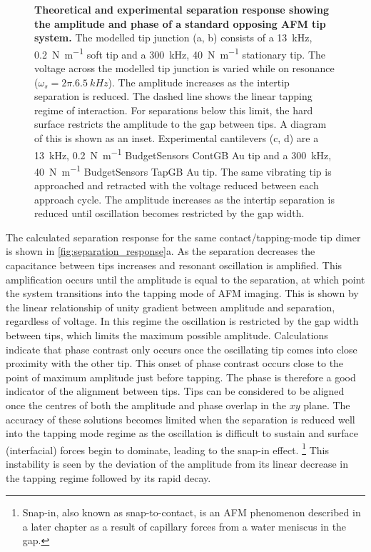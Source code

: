\documentclass{article}
\begin{document}
\begin{figure}[bt]
{\caption[Theoretical and experimental separation response showing the amplitude and phase of a standard opposing AFM tip system]{\textbf{Theoretical and experimental separation response showing the amplitude and phase of a standard opposing AFM tip system.} The modelled tip junction (a, b) consists of a \SI{13}{kHz}, \SI{0.2}{N.m^{-1}} soft tip and a \SI{300}{kHz}, \SI{40}{N.m^{-1}} stationary tip. The voltage across the modelled tip junction is varied while on resonance ($\omega_s = 2\pi.\SI{6.5}{kHz}$). The amplitude increases as the intertip separation is reduced. The dashed line shows the linear tapping regime of interaction. For separations below this limit, the hard surface restricts the amplitude to the gap between tips. A diagram of this is shown as an inset. Experimental cantilevers (c, d) are a \SI{13}{kHz}, \SI{0.2}{N.m^{-1}} BudgetSensors ContGB Au tip and a \SI{300}{kHz}, \SI{40}{N.m^{-1}} BudgetSensors TapGB Au tip. The same vibrating tip is approached and retracted with the voltage reduced between each approach cycle. The amplitude increases as the intertip separation is reduced until oscillation becomes restricted by the gap width.}
\label{fig:separation_response}}
\end{figure}

The calculated separation response for the same contact/tapping-mode tip dimer is shown in \autoref{fig:separation_response}a. As the separation decreases the capacitance between tips increases and resonant oscillation is amplified. This amplification occurs until the amplitude is equal to the separation, at which point the system transitions into the tapping mode of AFM imaging. This is shown by the linear relationship of unity gradient between amplitude and separation, regardless of voltage. In this regime the oscillation is restricted by the gap width between tips, which limits the maximum possible amplitude.
Calculations indicate that phase contrast only occurs once the oscillating tip comes into close proximity with the other tip. This onset of phase contrast occurs close to the point of maximum amplitude just before tapping. The phase is therefore a good indicator of the alignment between tips. Tips can be considered to be aligned once the centres of both the amplitude and phase overlap in the $xy$ plane. The accuracy of these solutions becomes limited when the separation is reduced well into the tapping mode regime as the oscillation is difficult to sustain and surface (interfacial) forces begin to dominate, leading to the snap-in effect.%
\footnote{Snap-in, also known as snap-to-contact, is an AFM phenomenon described in a later chapter as a result of capillary forces from a water meniscus in the gap.}
This instability is seen by the deviation of the amplitude from its linear decrease in the tapping regime followed by its rapid decay.
\end{document}
